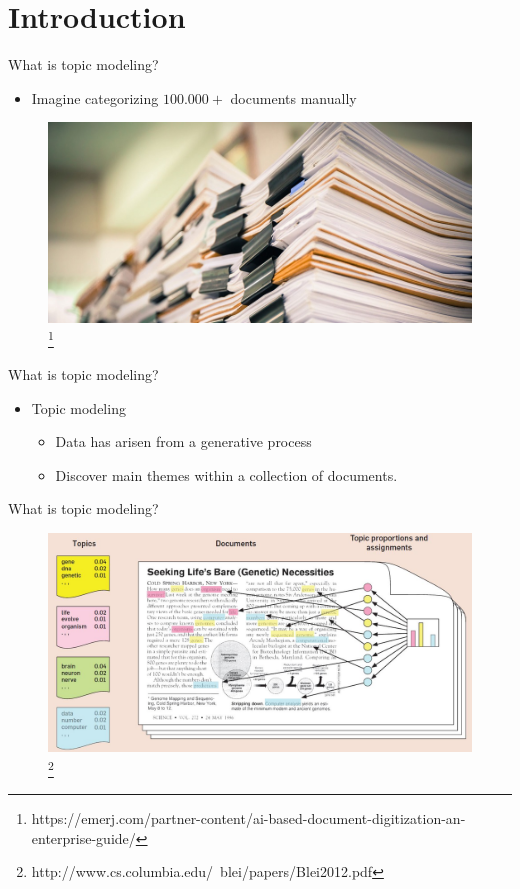 \section{Introduction}

\begin{frame}{\insertsection}{What is topic modeling?}
	\begin{itemize}
		\item Imagine categorizing $100.000+$ documents manually
	\end{itemize}
	\begin{figure}
		\includegraphics[width=\textwidth]{figures/documents.jpg}
		\let\thefootnote\relax\footnote{\tiny{https://emerj.com/partner-content/ai-based-document-digitization-an-enterprise-guide/}}
	\end{figure}
\end{frame}

\begin{frame}{\insertsection}{What is topic modeling?}
	\begin{itemize}
		\item Topic modeling
  		\begin{itemize}
			\item Data has arisen from a generative process
			\item Discover main themes within a collection of documents.
		\end{itemize}
	\end{itemize}
\end{frame}

\begin{frame}{\insertsection}{What is topic modeling?}
	\begin{figure}
		\includegraphics[width=\textwidth]{figures/topic_modeling_visual.JPG}
		\let\thefootnote\relax\footnote{\tiny{http://www.cs.columbia.edu/~blei/papers/Blei2012.pdf}}
	\end{figure}
\end{frame}

